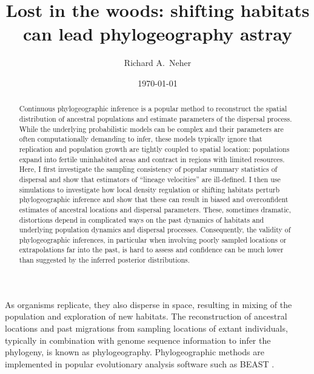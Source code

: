 \documentclass[aps,rmp, twocolumn]{revtex4}
\begin{document}
\title{Lost in the woods: shifting habitats can lead phylogeography astray}
\author{Richard A.~Neher}

\date{\today}
\begin{abstract}
Continuous phylogeographic inference is a popular method to reconstruct the spatial distribution of ancestral populations and estimate parameters of the dispersal process.
While the underlying probabilistic models can be complex and their parameters are often computationally demanding to infer, these models typically ignore that replication and population growth are tightly coupled to spatial location: populations expand into fertile uninhabited areas and contract in regions with limited resources.
Here, I first investigate the sampling consistency of popular summary statistics of dispersal and show that estimators of ``lineage velocities'' are ill-defined.
I then use simulations to investigate how local density regulation or shifting habitats perturb phylogeographic inference and show that these can result in biased and overconfident estimates of ancestral locations and dispersal parameters.
These, sometimes dramatic, distortions depend in complicated ways on the past dynamics of habitats and underlying population dynamics and dispersal processes.
Consequently, the validity of phylogeographic inferences, in particular when involving poorly sampled locations or extrapolations far into the past, is hard to assess and confidence can be much lower than suggested by the inferred posterior distributions.
\end{abstract}

\maketitle
As organisms replicate, they also disperse in space, resulting in mixing of the population and exploration of new habitats.
The reconstruction of ancestral locations and past migrations from sampling locations of extant individuals, typically in combination with genome sequence information to infer the phylogeny, is known as phylogeography.
Phylogeographic methods are implemented in popular evolutionary analysis software such as BEAST \citep{lemey_bayesian_2009,lemey_phylogeography_2010}.
\end{document}
